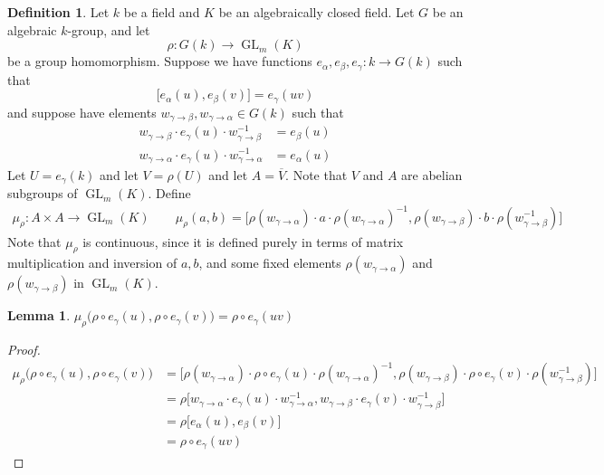 \documentclass[12pt]{article}
\newtheorem{lemma}{Lemma}
\theoremstyle{definition}
\newtheorem{definition}{Definition}
\newcommand{\inv}{^{-1}}
\newcommand{\ov}{\overline}
\DeclareMathOperator{\GL}{GL}
\begin{document}
\begin{definition}
Let $k$ be a field and $K$ be an algebraically closed field. Let $G$ be an algebraic $k$-group, and let
\[
	\rho:G(k) \to \GL_m(K)
\]
be a group homomorphism. Suppose we have functions $e_\alpha, e_\beta, e_\gamma:k \to G(k)$ such that
\[
	\Big[ e_\alpha(u),  e_\beta(v) \Big] = e_\gamma(uv)
\]
and suppose have elements $w_{\gamma \to \beta}, w_{\gamma \to \alpha} \in G(k)$ such that
\begin{align*}
	w_{\gamma \to \beta} \cdot e_\gamma (u) \cdot w_{\gamma \to \beta} \inv &= e_\beta (u) \\
	w_{\gamma \to \alpha} \cdot e_\gamma (u) \cdot w_{\gamma \to \alpha} \inv &= e_\alpha (u)
\end{align*}
Let $U = e_\gamma (k)$ and let $V = \rho(U)$ and let $A = \ov{V}$. Note that $V$ and $A$ are abelian subgroups of $\GL_m(K)$. Define
\begin{align*}
	\mu_\rho:A \times A \to \GL_m(K) \qquad
	\mu_\rho(a,b) = \Big[ \rho(w_{\gamma \to \alpha}) \cdot a \cdot \rho(w_{\gamma \to \alpha}) \inv, \rho(w_{\gamma \to \beta}) \cdot b \cdot \rho(w_{\gamma \to \beta} \inv) \Big]
\end{align*}
Note that $\mu_{\rho}$ is continuous, since it is defined purely in terms of matrix multiplication and inversion of $a, b$, and some fixed elements $\rho(w_{\gamma \to \alpha})$ and $\rho(w_{\gamma \to \beta})$ in $\GL_m(K)$. 
\end{definition}

\begin{lemma}
\label{multiplicative}
$\mu_\rho \Big( \rho  \circ e_\gamma(u), \rho \circ e_\gamma(v) \Big) = \rho \circ e_\gamma(uv)$
\end{lemma}
\begin{proof}
\begin{align*}
	\mu_\rho \Big( \rho  \circ e_\gamma(u), \rho \circ e_\gamma(v) \Big) &= \Big[ \rho(w_{\gamma \to \alpha}) \cdot \rho \circ e_\gamma(u) \cdot \rho(w_{\gamma \to \alpha}) \inv, \rho(w_{\gamma \to \beta}) \cdot \rho \circ e_\gamma(v) \cdot \rho(w_{\gamma \to \beta} \inv) \Big] \\
&= \rho \Big[ w_{\gamma \to \alpha} \cdot e_\gamma(u) \cdot w_{\gamma \to \alpha} \inv, w_{\gamma \to \beta} \cdot e_\gamma(v) \cdot w_{\gamma \to \beta} \inv \Big] \\
&= \rho \Big[ e_\alpha(u), e_\beta(v) \Big] \\
&=  \rho \circ e_\gamma(uv)
\end{align*}
\end{proof}
\end{document}
